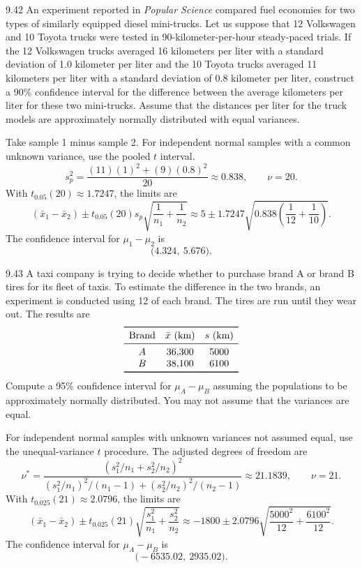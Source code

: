 \documentclass[11pt,oneside]{article}
\begin{document}
\begin{exercise}{9.42}
An experiment reported in \textit{Popular Science} compared fuel economies for two types of similarly equipped diesel mini-trucks. Let us suppose that 12 Volkswagen and 10 Toyota trucks were tested in 90-kilometer-per-hour steady-paced trials. If the 12 Volkswagen trucks averaged 16 kilometers per liter with a standard deviation of 1.0 kilometer per liter and the 10 Toyota trucks averaged 11 kilometers per liter with a standard deviation of 0.8 kilometer per liter, construct a 90\% confidence interval for the difference between the average kilometers per liter for these two mini-trucks. Assume that the distances per liter for the truck models are approximately normally distributed with equal variances.
\end{exercise}
\begin{solution}
Take sample 1 minus sample 2. For independent normal samples with a common unknown variance, use the pooled $t$ interval.
\[
s_p^2=\frac{(11)(1)^2+(9)(0.8)^2}{20}\approx0.838,\qquad \nu=20.
\]
 With $t_{0.05}(20)\approx1.7247$, the limits are
\[
(\bar x_1-\bar x_2)\pm t_{0.05}(20)s_p\sqrt{\frac1{n_1}+\frac1{n_2}}\approx 5\pm 1.7247\sqrt{0.838\left(\frac1{12}+\frac1{10}\right)}.
\]
The confidence interval for $\mu_1-\mu_2$ is 
\[
\boxed{\bigl(4.324,\ 5.676\bigr)}.
\]
\end{solution}

\begin{exercise}{9.43}
A taxi company is trying to decide whether to purchase brand A or brand B tires for its fleet of taxis. To estimate the difference in the two brands, an experiment is conducted using 12 of each brand. The tires are run until they wear out. The results are
\[
\begin{array}{ccc}\toprule
\text{Brand} & \bar x\text{ (km)} & s\text{ (km)}\\\midrule
A & 36{,}300 & 5000\\
B & 38{,}100 & 6100\\
\bottomrule\end{array}
\]
Compute a 95\% confidence interval for $\mu_A-\mu_B$ assuming the populations to be approximately normally distributed. You may not assume that the variances are equal.
\end{exercise}
\begin{solution}
For independent normal samples with unknown variances not assumed equal, use the unequal-variance $t$ procedure. The adjusted degrees of freedom are
\[
\nu^*=\frac{(s_1^2/n_1+s_2^2/n_2)^2}{(s_1^2/n_1)^2/(n_1-1)+(s_2^2/n_2)^2/(n_2-1)}\approx21.1839,\qquad \nu=21.
\]
 With $t_{0.025}(21)\approx2.0796$, the limits are
\[
(\bar x_1-\bar x_2)\pm t_{0.025}(21)\sqrt{\frac{s_1^2}{n_1}+\frac{s_2^2}{n_2}}\approx -1800\pm 2.0796\sqrt{\frac{5000^2}{12}+\frac{6100^2}{12}}.
\]
The confidence interval for $\mu_A-\mu_B$ is 
\[
\boxed{\bigl(-6535.02,\ 2935.02\bigr)}.
\]
\end{solution}
\end{document}

